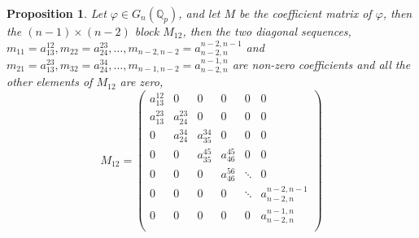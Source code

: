 \documentclass[12pt,fleqn]{article}
\newtheorem{proposition}[theorem]{Proposition}
\begin{document}
\begin{proposition}
\label{block.m12}
Let $\varphi\in G_n(\mathbb{Q}_p)$, and let $M$ be the coefficient matrix of $\varphi$, then the $(n-1)\times(n-2)$ block $M_{12}$, then the two diagonal sequences, $m_{11}=a_{13}^{12},m_{22}=a_{24}^{23},\dots,m_{n-2,n-2}=a_{n-2,n}^{n-2,n-1}$ and $m_{21}=a_{13}^{23},m_{32}=a_{24}^{34},\dots,m_{n-1,n-2}=a_{n-2,n}^{n-1,n}$ are non-zero coefficients and all the other elements of $M_{12}$ are zero,\[M_{12}=\begin{pmatrix}
a_{13}^{12} & 0 & 0 & 0 & 0 & 0\\
a_{13}^{23} & a_{24}^{23} & 0 & 0 & 0 & 0\\
0 & a_{24}^{34} & a_{35}^{34} & 0 & 0 & 0\\
0 & 0 & a_{35}^{45} & a_{46}^{45} & 0 & 0\\
0 & 0 & 0 & a_{46}^{56} & \ddots & 0\\
0 & 0 & 0 & 0 & \ddots & a_{n-2,n}^{n-2,n-1}\\
0 & 0 & 0 & 0 & 0 & a_{n-2,n}^{n-1,n}\\
\end{pmatrix}
\]
\end{proposition}
\end{document}
